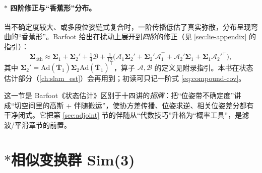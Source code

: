 \paragraph{$*$ 四阶修正与“香蕉形”分布。}当不确定度较大、或多段位姿链式复合时，一阶传播低估了真实弥散，分布呈现弯曲的“香蕉形”。Barfoot 给出在扰动上展开到\emph{四阶}的修正（见 \cref{sec:lie-appendix} 的指引）：
\begin{equation}
  \boldsymbol{\Sigma}_{4\text{th}}\approx\boldsymbol{\Sigma}_1+\boldsymbol{\Sigma}_2'+\tfrac14\boldsymbol{\mathcal{B}}+\tfrac{1}{12}\big(\boldsymbol{\mathcal{A}}_1\boldsymbol{\Sigma}_2'+\boldsymbol{\Sigma}_2'\boldsymbol{\mathcal{A}}_1^\top+\boldsymbol{\mathcal{A}}_2'\boldsymbol{\Sigma}_1+\boldsymbol{\Sigma}_1\boldsymbol{\mathcal{A}}_2'^\top\big),
  \label{eq:fourth-order}
\end{equation}
其中 $\boldsymbol{\Sigma}_2'=\mathrm{Ad}(\bar{\mathbf{T}}_1)\boldsymbol{\Sigma}_2\mathrm{Ad}(\bar{\mathbf{T}}_1)^\top$，算子 $\boldsymbol{\mathcal{A}},\boldsymbol{\mathcal{B}}$ 的定义见附录指引。本书在状态估计部分（\cref{ch:slam_est}）会再用到；初读可只记一阶式 \cref{eq:compound-cov}。

\begin{insight}
这一节是 Barfoot《状态估计》区别于十四讲的\emph{招牌}：把“位姿带不确定度”讲成“切空间里的高斯 + 伴随搬运”，使协方差传播、位姿求逆、相关位姿差分都有干净闭式。它把第 \ref{sec:adjoint} 节的伴随从“代数技巧”升格为“概率工具”，是滤波/平滑章节的前置。
\end{insight}

\section{\texorpdfstring{$*$}{*}相似变换群 Sim(3)}
\label{sec:sim3}

